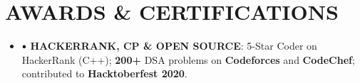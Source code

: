 \documentclass[letterpaper,11pt]{article}
\newcommand\sbullet[1][.5]{\mathbin{\vcenter{\hbox{\scalebox{#1}{$\bullet$}}}}}
\begin{document}
\section{\textcolor{NavyBlue}{AWARDS \& CERTIFICATIONS}}
\vspace{-1pt}
\begin{itemize}[itemsep=-1pt, parsep=0.5pt, topsep=0pt, left=1.3em]
   \item[] \hspace{0em}{} \vspace{-9.5pt} 
   
   \hspace{-.90em}$\sbullet[.80]${ \large \textbf{HACKERRANK, CP \& OPEN SOURCE}: 5-Star Coder on HackerRank (C++); \textbf{200+} DSA problems on \textbf{Codeforces} and \textbf{CodeChef}; contributed to \textbf{Hacktoberfest 2020}.}\vspace{-1pt} 
\end{itemize}
\end{document}
